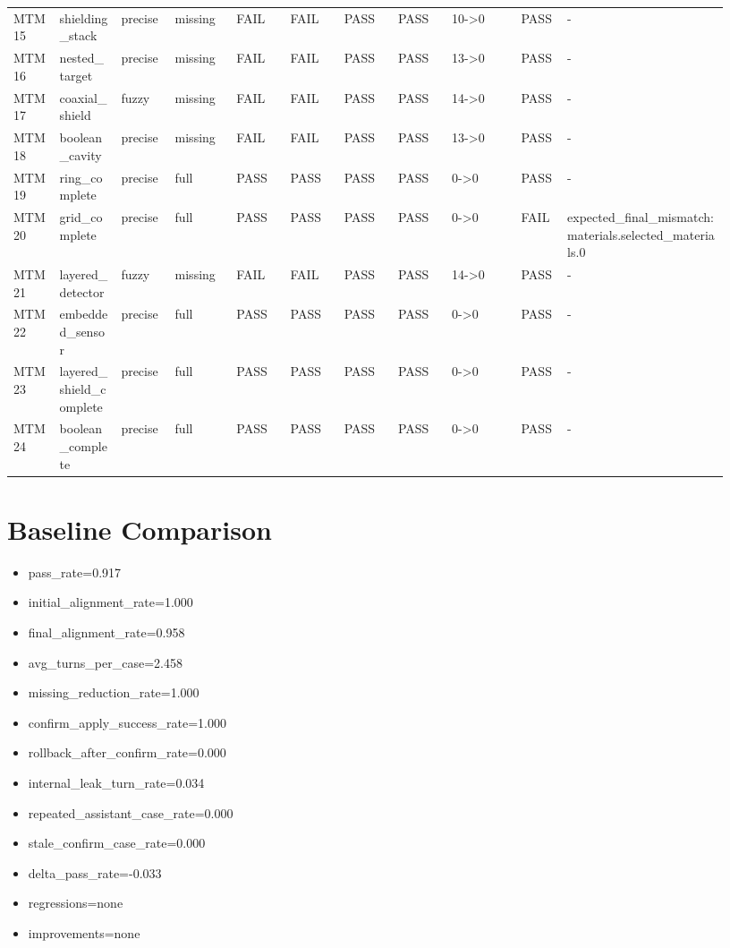 \documentclass[11pt]{ctexart}
\begin{document}
\begin{longtable}{p{0.06\linewidth}p{0.08\linewidth}p{0.07\linewidth}p{0.08\linewidth}p{0.07\linewidth}p{0.07\linewidth}p{0.07\linewidth}p{0.07\linewidth}p{0.09\linewidth}p{0.06\linewidth}p{0.21\linewidth}}
MTM15 & shielding\_stack & precise & missing & FAIL & FAIL & PASS & PASS & 10->0 & PASS & - \\
MTM16 & nested\_target & precise & missing & FAIL & FAIL & PASS & PASS & 13->0 & PASS & - \\
MTM17 & coaxial\_shield & fuzzy & missing & FAIL & FAIL & PASS & PASS & 14->0 & PASS & - \\
MTM18 & boolean\_cavity & precise & missing & FAIL & FAIL & PASS & PASS & 13->0 & PASS & - \\
MTM19 & ring\_complete & precise & full & PASS & PASS & PASS & PASS & 0->0 & PASS & - \\
MTM20 & grid\_complete & precise & full & PASS & PASS & PASS & PASS & 0->0 & FAIL & expected\_final\_mismatch:materials.selected\_materials.0 \\
MTM21 & layered\_detector & fuzzy & missing & FAIL & FAIL & PASS & PASS & 14->0 & PASS & - \\
MTM22 & embedded\_sensor & precise & full & PASS & PASS & PASS & PASS & 0->0 & PASS & - \\
MTM23 & layered\_shield\_complete & precise & full & PASS & PASS & PASS & PASS & 0->0 & PASS & - \\
MTM24 & boolean\_complete & precise & full & PASS & PASS & PASS & PASS & 0->0 & PASS & - \\
\bottomrule
\end{longtable}
\section{Baseline Comparison}
\begin{itemize}
\item pass\_rate=0.917
\item initial\_alignment\_rate=1.000
\item final\_alignment\_rate=0.958
\item avg\_turns\_per\_case=2.458
\item missing\_reduction\_rate=1.000
\item confirm\_apply\_success\_rate=1.000
\item rollback\_after\_confirm\_rate=0.000
\item internal\_leak\_turn\_rate=0.034
\item repeated\_assistant\_case\_rate=0.000
\item stale\_confirm\_case\_rate=0.000
\item delta\_pass\_rate=-0.033
\item regressions=none
\item improvements=none
\end{itemize}
\appendix
\end{document}
